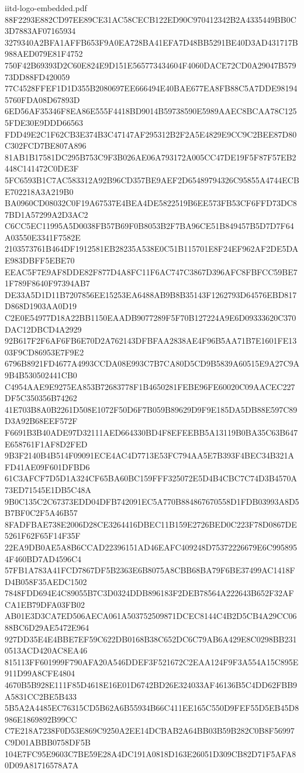 \begin{filecontents*}[overwrite]{iitd-logo-embedded.pdf}
88F2293E882CD97EE89CE31AC58CECB122ED90C970412342B2A4335449BB0C3D7883AF07165934
3279340A2BFA1AFFB653F9A0EA728BA41EFA7D48BB5291BE40D3AD431717B988AED079E81F4752
750F42B69393D2C60E824E9D151E565773434604F4060DACE72CD0A29047B57973DD88FD420059
77C4528FFEF1D1D355B2080697EE666494E40BAE677EA8FB88C5A7DDE981945760FDA08D67893D
6ED56AF35346F8EA86E555F4418BD9014B59738590E5989AAEC8BCAA78C1255FDE30E9DDD66563
FDD49E2C1F62CB3E374B3C47147AF295312B2F2A5E4829E9CC9C2BEE87D80C302FCD7BE807A896
81AB1B17581DC295B753C9F3B026AE06A793172A005CC47DE19F5F87F57EB2448C141472C0DE3F
5FC6593B1C7AC583312A92B96CD357BE9AEF2D65489794326C95855A4744ECBE702218A3A219B0
BA0960CD08032C0F19A67537E4BEA4DE5822519B6EE573FB53CF6FFD73DC87BD1A57299A2D3AC2
C6CC5EC11995A5D0038FB57B69F0B8053B2F7BA96CE51B849457B5D7D7F64A03550E3341F7582E
2103573761B464DF1912581EB28235A538E0C51B115701E8F24EF962AF2DE5DAE983DBFF5EBE70
EEAC5F7E9AF8DDE82F877D4A8FC11F6AC747C3867D396AFC8FBFCC59BE71F789F8640F97394AB7
DE33A5D1D11B7207856EE15253EA6488AB9B8B35143F1262793D64576EBD817D868D1903AA0D19
C2E0E54977D18A22BB1150EAADB9077289F5F70B127224A9E6D09333620C370DAC12DBCD4A2929
92B617F2F6AF6FB6E70D2A762143DFBFAA2838AE4F96B5AA71B7E1601FE1303F9CD86953E7F9E2
6796B8921FD4677A4993CCDA08E993C7B7CA80D5CD9B5839A60515E9A27C9A9B4B530502441CB0
C4954AAE9E9275EA853B72683778F1B4650281FEBE96FE60020C09AACEC227DF5C350356B74262
41E703B8A0B2261D508E1072F50D6F7B059B89629D9F9E185DA5DB88E597C89D3A92B68EEF572F
F6691B3B40ADE97D32111AED664330BD4F8EFEEBB5A13119B0BA35C63B647E658761F1AF8D2FED
9B3F2140B4B514F09091ECE4AC4D7713E53FC794AA5E7B393F4BEC34B321AFD41AE09F601DFBD6
61C3AFCF7D5D1A324CF65BA60BC159FFF325072E5D4B4CBC7C74D3B4570A73ED71545E1DB5C48A
9B0C135C2C67373EDD04DFB742091EC5A770B884867670558D1FDB03993A8D5B7BF0C2F5A46B57
8FADFBAE738E2006D28CE3264416DBEC11B159E2726BED0C223F78D0867DE5261F62F65F14F35F
22EA9DB0AE5A8B6CCAD22396151AD46EAFC409248D75372226679E6C9958954F460BD7AD4596C4
57FB1A783A41FCD7867DF5B2363E6B8075A8CBB68BA79F6BE37499AC1418FD4B058F35AEDC1502
7848FDD694E4C89055B7C3D0324DDB896183F2DEB78564A222643B652F32AFCA1EB79DFA03FB02
AB01E3D3CA7ED506AECA061A503752509871DCEC8144C4B2D5CB4A29CC0688BC6D29AE5472E964
927DD35E4E4BBE7EF59C622DB0168B38C652DC6C79AB6A429E8C0298BB2310513ACD420AC8EA46
815113FF601999F790AFA20A546DDEF3F521672C2EAA124F9F3A554A15C895E911D99A8CFE4804
4670B5B928E111F85D4618E16E01D6742BD26E324033AF46136B5C4DD62FBB9A5831CC2BE5B433
5B5A2A4485EC76315CD5B62A6B55934B66C411EE165C550D9FEF55D5EB45D8986E1869892B99CC
C7E218A7238F0D53E869C9250A2EE14DCBAB2A64BB03B59B282C0B8F56997C9D01ABBB0758DF5B
104E7FC95E9603C7BE59E28A4DC191A0818D163E26051D309CB82D71F5AFA80D09A81716578A7A

\end{filecontents*}
